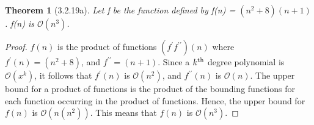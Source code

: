 \documentclass[a4paper, 12pt]{article}
\theoremstyle{plain}
\newtheorem*{theorem*}{Theorem}
\begin{document}
	
	\begin{theorem*}[3.2.19a]
		Let f be the function defined by f(n) = $(n^{2} + 8)(n + 1)$. \newline f(n) is $\mathcal{O}(n^{3})$.
	\end{theorem*}
	
	\begin{proof}
		$f(n)$ is the product of functions $(f^\prime f^{\prime\prime})(n)$ where $f^\prime(n) = (n^{2} + 8)$, and $f^{\prime\prime} = (n + 1)$. Since a $k \textsuperscript{th}$ degree polynomial is $\mathcal{O}(x^{k})$, it follows that $f^\prime(n)$ is $\mathcal{O}(n^{2})$, and $f^{\prime\prime}(n)$ is $\mathcal{O}(n)$. The upper bound for a product of functions is the product of the bounding functions for each function occurring in the product of functions. Hence, the upper bound for $f(n)$ is $\mathcal{O}(n(n^{2}))$. This means that $f(n)$ is $\mathcal{O}(n^{3})$.
	\end{proof}
\end{document}
